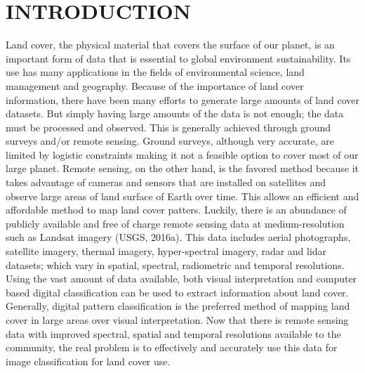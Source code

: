 \documentclass[letterpaper, 10 pt, conference]{ieeeconf}  %
\begin{document}
\section{INTRODUCTION}

Land cover, the physical material that covers the surface of our planet, is an important form of data that is essential to global environment sustainability. Its use has many applications in the fields of environmental science, land management and geography. Because of the importance of land cover information, there have been many efforts to generate large amounts of land cover datasets. But simply having large amounts of the data is not enough; the data must be processed and observed. This is generally achieved through ground surveys and/or remote sensing. Ground surveys, although very accurate, are limited by logistic constraints making it not a feasible option to cover most of our large planet. Remote sensing, on the other hand, is the favored method because it takes advantage of cameras and sensors that are installed on satellites and observe large areas of land surface of Earth over time. This allows an efficient and affordable method to map land cover patters. Luckily, there is an abundance of publicly available and free of charge remote sensing data at medium-resolution such as Landsat imagery (USGS, 2016a). This data includes aerial photographs, satellite imagery, thermal imagery, hyper-spectral imagery, radar and lidar datasets; which vary in spatial, spectral, radiometric and temporal resolutions. Using the vast amount of data available, both visual interpretation and computer based digital classification can be used to extract information about land cover. Generally, digital pattern classification is the preferred method of mapping land cover in large areas over visual interpretation. Now that there is remote sensing data with improved spectral, spatial and temporal resolutions available to the community, the real problem is to effectively and accurately use this data for image classification for land cover use.
\end{document}
